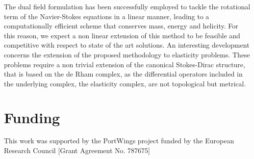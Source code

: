 \documentclass{elsarticle}
\begin{document}
The dual field formulation has been successfully employed to tackle the rotational term of the Navier-Stokes equations in a linear manner, leading to a computationally efficient scheme that conserves mass, energy and helicity. For this reason, we expect a non linear extension of this method to be feasible and competitive with respect to state of the art solutions. An interesting development concerns the extension of the proposed methodology to elasticity problems. These problems require a non trivial extension of the canonical Stokes-Dirac structure, that is based on the de Rham complex, as the differential operators included in the underlying complex, the elasticity complex, are not topological but metrical.


\section*{Funding}

This work was supported by the PortWings project funded by the European Research Council [Grant Agreement No. 787675]




\appendix
\end{document}
